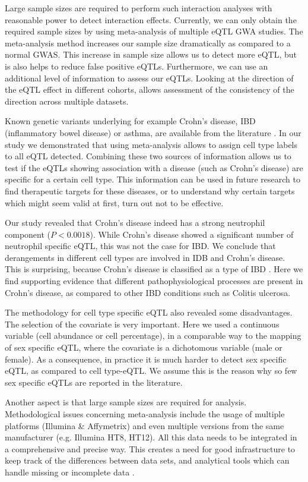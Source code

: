 Large sample sizes are required to perform such interaction analyses with reasonable power to detect interaction effects. Currently, we can only 
obtain the required sample sizes by using meta-analysis of multiple eQTL GWA studies. The meta-analysis method increases our sample size dramatically 
as compared to a normal GWAS. This increase in sample size allows us to detect more eQTL, but is also helps to reduce false positive eQTLs. Furthermore, 
we can use an additional level of information to assess our eQTLs. Looking at the direction of the eQTL effect in different cohorts, allows assessment 
of the consistency of the direction across multiple datasets. 

Known genetic variants underlying for example Crohn’s disease, IBD (inflammatory bowel disease) or asthma, are available from the literature 
\cite{Hindorff:2009}. In our study we demonstrated that using meta-analysis allows to assign cell type labels to all eQTL detected. Combining 
these two sources of information allows us to test if the eQTLs showing association with a disease (such as Crohn’s disease) are specific for a 
certain cell type. This information can be used in future research to find therapeutic targets for these diseases, or to understand why certain 
targets which might seem valid at first, turn out not to be effective.

Our study revealed that Crohn's disease indeed has a strong neutrophil component ($P < 0.0018$). While Crohn’s disease showed a significant number of 
neutrophil specific eQTL, this was not the case for IBD. We conclude that derangements in different cell types are involved in IDB and Crohn’s disease. 
This is surprising, because Crohn’s disease is classified as a type of IBD \cite{Sandborn:2012}. Here we find supporting evidence that different 
pathophysiological processes are present in Crohn’s disease, as compared to other IBD conditions such as Colitis ulcerosa. 

The methodology for cell type specific eQTL also revealed some disadvantages. The selection of the covariate is very important. Here we used a 
continuous variable (cell abundance or cell percentage), in a comparable way to the mapping of sex specific eQTL, where the covariate is a 
dichotomous variable (male or female). As a consequence, in practice it is much harder to detect sex specific eQTL, as compared to cell type-eQTL. 
We assume this is the reason why so few sex specific eQTLs are reported in the literature.

Another aspect is that large sample sizes are required for analysis. Methodological issues concerning meta-analysis include the usage of multiple 
platforms (Illumina & Affymetrix) and even multiple versions from the same manufacturer (e.g. Illumina HT8, HT12). All this data needs to be 
integrated in a comprehensive and precise way.  This creates a need for good infrastructure to keep track of the differences between data sets, 
and analytical tools which can handle missing or incomplete data \cite{Trelles:2011, Prins:2012}.

